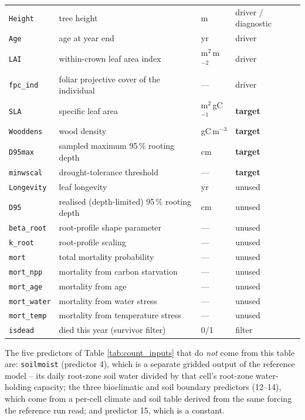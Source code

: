 \documentclass[11pt]{article}
\begin{document}
\begin{table}[h]
\begin{tabular}{llll}
\texttt{Height} & tree height & m & driver / diagnostic \\
\texttt{Age} & age at year end & yr & driver \\
\texttt{LAI} & within-crown leaf area index & m$^2$\,m$^{-2}$ & driver \\
\texttt{fpc\_ind} & foliar projective cover of the individual & --- & driver \\
\midrule
\texttt{SLA} & specific leaf area & m$^2$\,gC$^{-1}$ & \textbf{target} \\
\texttt{Wooddens} & wood density & gC\,m$^{-3}$ & \textbf{target} \\
\texttt{D95max} & sampled maximum 95\,\% rooting depth & cm & \textbf{target} \\
\texttt{minwscal} & drought-tolerance threshold & --- & \textbf{target} \\
\texttt{Longevity} & leaf longevity & yr & unused \\
\texttt{D95} & realised (depth-limited) 95\,\% rooting depth & cm & unused \\
\texttt{beta\_root} & root-profile shape parameter & --- & unused \\
\texttt{k\_root} & root-profile scaling & --- & unused \\
\midrule
\texttt{mort} & total mortality probability & --- & unused \\
\texttt{mort\_npp} & mortality from carbon starvation & --- & unused \\
\texttt{mort\_age} & mortality from age & --- & unused \\
\texttt{mort\_water} & mortality from water stress & --- & unused \\
\texttt{mort\_temp} & mortality from temperature stress & --- & unused \\
\texttt{isdead} & died this year (survivor filter) & 0/1 & filter \\
\bottomrule
\end{tabular}
\end{table}

The five predictors of Table \ref{tab:count_inputs} that do \emph{not} come from this table are: \texttt{soilmoist} (predictor 4), which is a separate gridded output of the reference model -- its daily root-zone soil water divided by that cell's root-zone water-holding capacity; the three bioclimatic and soil boundary predictors (12--14), which come from a per-cell climate and soil table derived from the same forcing the reference run read; and predictor 15, which is a constant.
\end{document}

